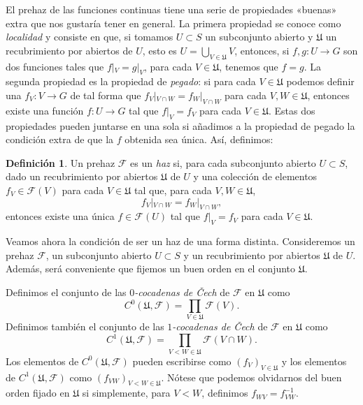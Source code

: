 \documentclass[12pt,a4paper]{article}
\theoremstyle{definition} \newtheorem{defn}[thm]{Definición}
\theoremstyle{definition} \newtheorem{ejemplo}[thm]{Ejemplo}
\theoremstyle{definition} \newtheorem{ejercicio}[thm]{Ejercicio}
\def\FF{\mathscr{F}}
\def\UU{\mathfrak{U}}
\begin{document}
  El prehaz de las funciones continuas tiene una serie de propiedades «buenas» extra que nos gustaría tener en general. La primera propiedad se conoce como \emph{localidad} y consiste en que, si tomamos $U\subset S$ un subconjunto abierto y $\mathfrak{U}$ un recubrimiento por abiertos de $U$, esto es $U=\bigcup_{V \in \mathfrak{U}} V$, entonces, si $f,g:U\rightarrow G$ son dos funciones tales que $f|_{V} = g|_{V}$, para cada $V\in \mathfrak{U}$, tenemos que $f=g$. La segunda propiedad es la propiedad de \emph{pegado}: si para cada $V\in \mathfrak{U}$ podemos definir una $f_V:V\rightarrow G$ de tal forma que $f_V|_{V\cap W} = f_W|_{V\cap W}$ para cada $V,W \in \mathfrak{U}$, entonces existe una función $f:U\rightarrow G$ tal que $f|_V=f_V$ para cada $V\in \mathfrak{U}$. Estas dos propiedades pueden juntarse en una sola si añadimos a la propiedad de pegado la condición extra de que la $f$ obtenida sea única. Así, definimos:

  \begin{defn}
    Un prehaz $\FF$ es un \emph{haz} si, para cada subconjunto abierto $U\subset S$, dado un recubrimiento por abiertos $\mathfrak{U}$ de $U$ y una colección de elementos $f_V \in \FF(V)$ para cada $V\in \mathfrak{U}$ tal que, para cada $V,W\in \mathfrak{U}$,
    \begin{equation*}
      f_V|_{V\cap W} = f_W|_{V\cap W},
    \end{equation*}
    entonces existe una única $f\in \FF(U)$ tal que $f|_V=f_V$ para cada $V \in \mathfrak{U}$.
  \end{defn}

  Veamos ahora la condición de ser un haz de una forma distinta. Consideremos un prehaz $\FF$, un subconjunto abierto $U\subset S$ y un recubrimiento por abiertos $\UU$ de $U$. Además, será conveniente que fijemos un buen orden en el conjunto $\UU$. 

  Definimos el conjunto de las \emph{$0$-cocadenas de \v{C}ech} de $\FF$ en $\UU$ como
  \begin{equation*}
    C^0(\UU,\FF) = \prod_{V\in \UU} \FF(V).
  \end{equation*}
  Definimos también el conjunto de las \emph{$1$-cocadenas de \v{C}ech} de $\FF$ en $\UU$ como
  \begin{equation*}
    C^1(\UU,\FF) = \prod_{V<W\in \UU} \FF(V\cap W).
  \end{equation*}
  Los elementos de $C^0(\UU,\FF)$ pueden escribirse como $(f_V)_{V\in \UU}$ y los elementos de $C^1(\UU,\FF)$ como $(f_{VW})_{V<W \in \UU}$. Nótese que podemos olvidarnos del buen orden fijado en $\UU$ si simplemente, para $V<W$, definimos $f_{WV}=f_{VW}^{-1}$. 
  
\end{document}
